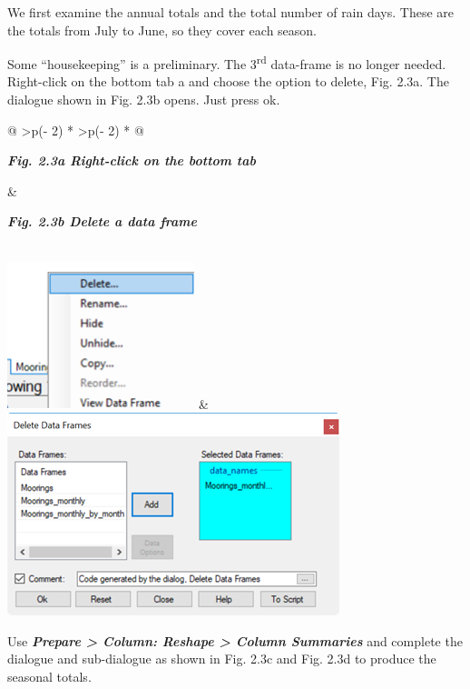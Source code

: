 \documentclass[
  letterpaper,
  DIV=11,
  numbers=noendperiod]{scrreprt}
\begin{document}
We first examine the annual totals and the total number of rain days.
These are the totals from July to June, so they cover each season.

Some ``housekeeping'' is a preliminary. The 3\textsuperscript{rd}
data-frame is no longer needed. Right-click on the bottom tab a and
choose the option to delete, Fig. 2.3a. The dialogue shown in Fig. 2.3b
opens. Just press ok.

\begin{longtable}[]{@{}
  >{\centering\arraybackslash}p{(\columnwidth - 2\tabcolsep) * }
  >{\centering\arraybackslash}p{(\columnwidth - 2\tabcolsep) * }@{}}
\toprule\noalign{}
\begin{minipage}[b]{\linewidth}\centering
\textbf{\emph{Fig. 2.3a Right-click on the bottom tab}}
\end{minipage} & \begin{minipage}[b]{\linewidth}\centering
\textbf{\emph{Fig. 2.3b Delete a data frame}}
\end{minipage} \\
\midrule\noalign{}
\endhead
\bottomrule\noalign{}
\endlastfoot
\includegraphics[width=2.15in,height=1.688in]{figures/Fig2.3a.png} &
\includegraphics[width=3.808in,height=2.323in]{figures/Fig2.3b.png} \\
\end{longtable}

Use \textbf{\emph{Prepare \textgreater{} Column: Reshape \textgreater{}
Column Summaries}} and complete the dialogue and sub-dialogue as shown
in Fig. 2.3c and Fig. 2.3d to produce the seasonal totals.
\end{document}
